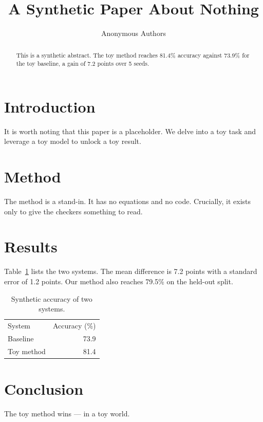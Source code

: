 \documentclass{article}
\newcommand{\accMain}{81.4}     %
\newcommand{\accBase}{73.9}     %
\newcommand{\gainPP}{7.2}       %
\newcommand{\seStd}{1.2}        %
\newcommand{\nSeeds}{5}         %
\begin{document}
\title{A Synthetic Paper About Nothing}
\author{Anonymous Authors}
\maketitle

\begin{abstract}
This is a synthetic abstract. The toy method reaches \accMain\% accuracy against
\accBase\% for the toy baseline, a gain of \gainPP{} points over \nSeeds{} seeds.
\end{abstract}

\section{Introduction}
It is worth noting that this paper is a placeholder. We delve into a toy task
and leverage a toy model to unlock a toy result.

\section{Method}
The method is a stand-in. It has no equations and no code.
Crucially, it exists only to give the checkers something to read.

\section{Results}
Table~\ref{tab:main} lists the two systems. The mean difference is \gainPP{} points
with a standard error of \seStd{} points.
Our method also reaches 79.5\% on the held-out split. %

\begin{table}[h]
\centering
\begin{tabular}{lr}
System & Accuracy (\%) \\
Baseline & \accBase \\
Toy method & \accMain \\
\end{tabular}
\caption{Synthetic accuracy of two systems.}
\label{tab:main}
\end{table}

\section{Conclusion}
The toy method wins --- in a toy world.
\end{document}
